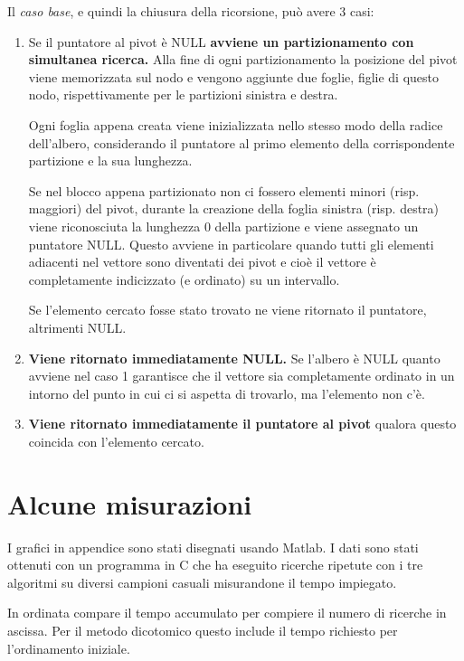 \documentclass{article}
\begin{document}
    Il \textit{caso base}, e quindi la chiusura della ricorsione, può avere 3
    casi:
    \begin{enumerate}
    \item Se il puntatore al pivot è NULL \textbf{avviene un partizionamento con
      simultanea ricerca.} Alla fine di ogni partizionamento la posizione del
      pivot viene memorizzata sul nodo e vengono aggiunte due foglie, figlie di
      questo nodo, rispettivamente per le partizioni sinistra e destra.

      Ogni foglia appena creata viene inizializzata nello stesso modo della
      radice dell'albero, considerando il puntatore al primo elemento della
      corrispondente partizione e la sua lunghezza.

      Se nel blocco appena partizionato non ci fossero elementi minori (risp.
      maggiori) del pivot, durante la creazione della foglia sinistra (risp.
      destra) viene riconosciuta la lunghezza 0 della partizione e viene
      assegnato un puntatore NULL. Questo avviene in particolare quando tutti
      gli elementi adiacenti nel vettore sono diventati dei pivot e cioè il
      vettore è completamente indicizzato (e ordinato) su un intervallo.

      Se l'elemento cercato fosse stato trovato ne viene ritornato il puntatore,
      altrimenti NULL.

    \item \textbf{Viene ritornato immediatamente NULL.} Se l'albero è NULL
      quanto avviene nel caso 1 garantisce che il vettore sia completamente
      ordinato in un intorno del punto in cui ci si aspetta di trovarlo, ma
      l'elemento non c'è.

    \item \textbf{Viene ritornato immediatamente il puntatore al pivot} qualora
      questo coincida con l'elemento cercato.
    \end{enumerate}

\section{Alcune misurazioni}
    I grafici in appendice sono stati disegnati usando Matlab. I dati sono stati
    ottenuti con un programma in C che ha eseguito ricerche ripetute con i tre
    algoritmi su diversi campioni casuali misurandone il tempo impiegato.

    In ordinata compare il tempo accumulato per compiere il numero di ricerche
    in ascissa. Per il metodo dicotomico questo include il tempo richiesto per
    l'ordinamento iniziale.
\end{document}
